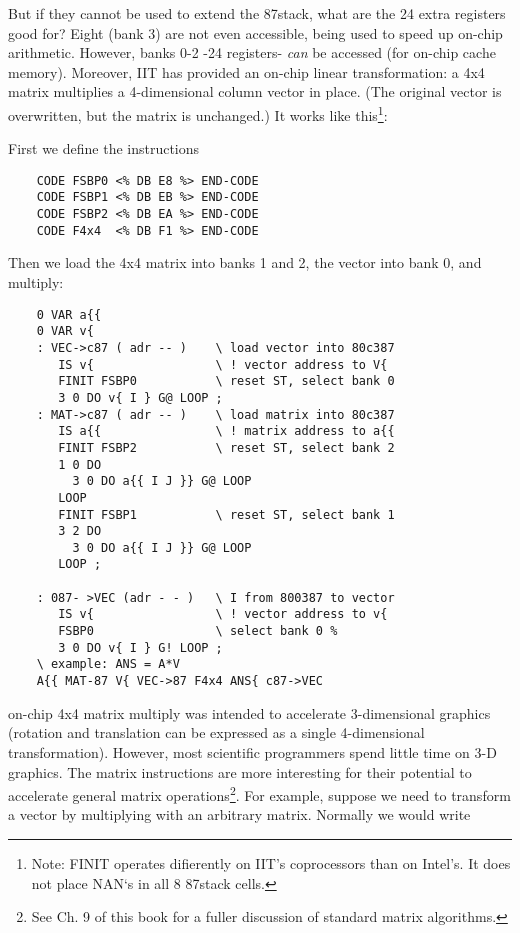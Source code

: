 But if they cannot be used to extend the 87stack, what are the 24 extra registers good for? Eight (bank 3) are not even accessible, being used to speed up on-chip arithmetic. However, banks 0-2 -24 registers- \textit{can} be accessed (\eg for on-chip cache memory). Moreover, IIT has provided an on-chip linear transformation: a 4x4 matrix multiplies a 4-dimensional column vector in place. (The original vector is overwritten, but the matrix is unchanged.) It works like this\footnote{Note: FINIT operates difierently on IIT’s coprocessors than on Intel’s. It does not place NAN‘s in all 8 87stack cells.}:

First we define the instructions

\begin{lstlisting}
    CODE FSBP0 <% DB E8 %> END-CODE
    CODE FSBP1 <% DB EB %> END-CODE
    CODE FSBP2 <% DB EA %> END-CODE
    CODE F4x4  <% DB F1 %> END-CODE
\end{lstlisting}

Then we load the 4x4 matrix into banks 1 and 2, the vector into bank 0, and multiply:

\begin{lstlisting}
    0 VAR a{{
    0 VAR v{
    : VEC->c87 ( adr -- )    \ load vector into 80c387
       IS v{                 \ ! vector address to V{
       FINIT FSBP0           \ reset ST, select bank 0
       3 0 DO v{ I } G@ LOOP ;
    : MAT->c87 ( adr -- )    \ load matrix into 80c387
       IS a{{                \ ! matrix address to a{{
       FINIT FSBP2           \ reset ST, select bank 2
       1 0 DO
         3 0 DO a{{ I J }} G@ LOOP
       LOOP
       FINIT FSBP1           \ reset ST, select bank 1
       3 2 DO
         3 0 DO a{{ I J }} G@ LOOP
       LOOP ;
       
    : 087- >VEC (adr - - )   \ I from 800387 to vector
       IS v{                 \ ! vector address to v{
       FSBP0                 \ select bank 0 %
       3 0 DO v{ I } G! LOOP ;
    \ example: ANS = A*V
    A{{ MAT-87 V{ VEC->87 F4x4 ANS{ c87->VEC
\end{lstlisting}
 

 on-chip 4x4 matrix multiply was intended to accelerate 3-dimensional graphics (rotation and translation can be expressed as a single 4-dimensional transformation). However, most scientific programmers spend little time on 3-D graphics. The matrix instructions are more interesting for their potential to accelerate general matrix operations\footnote{See Ch. 9 of this book for a fuller discussion of standard matrix algorithms.}. For example, suppose we need to transform a vector by multiplying with an arbitrary matrix. Normally we would write

